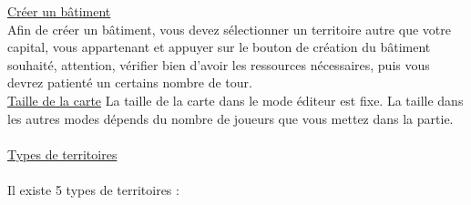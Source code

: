    \underline{Créer un bâtiment}\\
Afin de créer un bâtiment, vous devez sélectionner un territoire autre que votre capital, vous appartenant et appuyer sur le bouton de création du bâtiment souhaité, attention, vérifier bien d'avoir les ressources nécessaires, puis vous devrez patienté un certains nombre de tour. \\
 
 \underline{Taille de la carte}
 La taille de la carte dans le mode éditeur est fixe.
 La taille dans les autres modes dépends du nombre de joueurs que vous mettez dans la partie.\\
 \\
 \underline{Types de territoires}\\
 \\
 Il existe 5 types de territoires : \\
